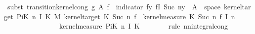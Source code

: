 \begin{isabellebody}
\ {\isacharparenleft}{\kern0pt}subst\ transition{\isacharunderscore}{\kern0pt}kernel{\isacharunderscore}{\kern0pt}cong{\isacharbrackleft}{\kern0pt}\ g{\isacharequal}{\kern0pt}{\isachardoublequoteopen}{\isacharparenleft}{\kern0pt}{\isasymlambda}{\isasymomega}\ A{\isacharprime}{\kern0pt}{\isachardot}{\kern0pt}\ {\isasymintegral}\isactrlsup {\isacharplus}{\kern0pt}{\isasymomega}\isactrlsub f{\isachardot}{\kern0pt}\ {\isacharparenleft}{\kern0pt}{\isasymintegral}\isactrlsup {\isacharplus}{\kern0pt}{\isasymomega}{\isachardot}{\kern0pt}\ indicator\ {\isacharparenleft}{\kern0pt}{\isacharparenleft}{\kern0pt}{\isasymlambda}{\isacharparenleft}{\kern0pt}f{\isacharcomma}{\kern0pt}y{\isacharparenright}{\kern0pt}{\isachardot}{\kern0pt}\ f{\isacharparenleft}{\kern0pt}I\ {\isacharparenleft}{\kern0pt}Suc\ n{\isacharparenright}{\kern0pt}{\isacharcolon}{\kern0pt}{\isacharequal}{\kern0pt}y{\isacharparenright}{\kern0pt}{\isacharparenright}{\kern0pt}\ {\isacharminus}{\kern0pt}{\isacharbackquote}{\kern0pt}\ A{\isacharprime}{\kern0pt}\ {\isasyminter}\ space\ {\isacharparenleft}{\kern0pt}kernel{\isacharunderscore}{\kern0pt}target\ {\isacharparenleft}{\kern0pt}PiK\ n\ I\ K{\isacharparenright}{\kern0pt}\ {\isasymOtimes}\isactrlsub M\ {\isacharparenleft}{\kern0pt}kernel{\isacharunderscore}{\kern0pt}target\ {\isacharparenleft}{\kern0pt}{\isacharquery}{\kern0pt}K\ {\isacharparenleft}{\kern0pt}Suc\ n{\isacharparenright}{\kern0pt}{\isacharparenright}{\kern0pt}{\isacharparenright}{\kern0pt}{\isacharparenright}{\kern0pt}{\isacharparenright}{\kern0pt}\ {\isacharparenleft}{\kern0pt}{\isasymomega}\isactrlsub f{\isacharcomma}{\kern0pt}\ {\isasymomega}{\isacharparenright}{\kern0pt}\ {\isasympartial}kernel{\isacharunderscore}{\kern0pt}measure\ {\isacharparenleft}{\kern0pt}{\isacharquery}{\kern0pt}K\ {\isacharparenleft}{\kern0pt}Suc\ n{\isacharparenright}{\kern0pt}{\isacharparenright}{\kern0pt}\ {\isacharparenleft}{\kern0pt}{\isasymomega}\isactrlsub f\ {\isacharparenleft}{\kern0pt}I\ n{\isacharparenright}{\kern0pt}{\isacharparenright}{\kern0pt}{\isacharparenright}{\kern0pt}\isanewline
\ \ \ \ \ \ \ \ \ \ \ \ \ \ \ \ {\isasympartial}kernel{\isacharunderscore}{\kern0pt}measure\ {\isacharparenleft}{\kern0pt}PiK\ n\ I\ K{\isacharparenright}{\kern0pt}\ {\isasymomega}{\isacharparenright}{\kern0pt}{\isachardoublequoteclose}{\isacharbrackright}{\kern0pt}{\isacharparenright}{\kern0pt}\isanewline
\ \ \ \ \ \isamarkupfalse%
\ {\isacharparenleft}{\kern0pt}rule\ nn{\isacharunderscore}{\kern0pt}integral{\isacharunderscore}{\kern0pt}cong{\isacharparenright}{\kern0pt}\isanewline

\end{isabellebody}
